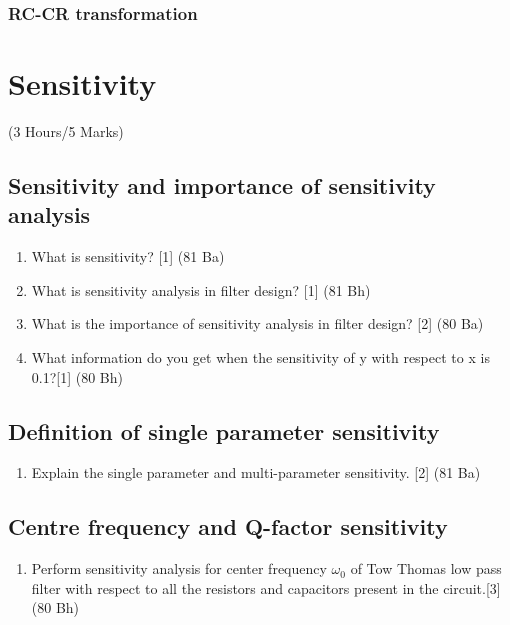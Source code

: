 \documentclass[12pt]{article}
\begin{document}
		\subsubsection{RC-CR transformation}

\pagebreak

\section{Sensitivity}
\begin{center}(3 Hours/5 Marks)\end{center}
\subsection{Sensitivity and importance of sensitivity analysis}
\begin{enumerate}
    \item What is sensitivity? \hfill [1] (81 Ba)
\item What is sensitivity analysis in filter design? \hfill [1] (81 Bh)
\item What is the importance of sensitivity analysis in filter design? \hfill[2] (80 Ba)
\item What information do you get when the sensitivity of y with respect to x is 0.1?\hfill [1] (80 Bh)
\end{enumerate}
\subsection{Definition of single parameter sensitivity}
    \begin{enumerate}[noitemsep, topsep=0pt]
        \item Explain the single parameter and multi-parameter sensitivity. \hfill [2] (81 Ba)
    \end{enumerate}

\subsection{Centre frequency and Q-factor sensitivity}
\begin{enumerate}
\item Perform sensitivity analysis for center frequency $\omega_0$ of Tow Thomas low pass filter with respect to all the resistors and capacitors present in the circuit.\hfill[3] (80 Bh)
\end{enumerate}
\end{document}
